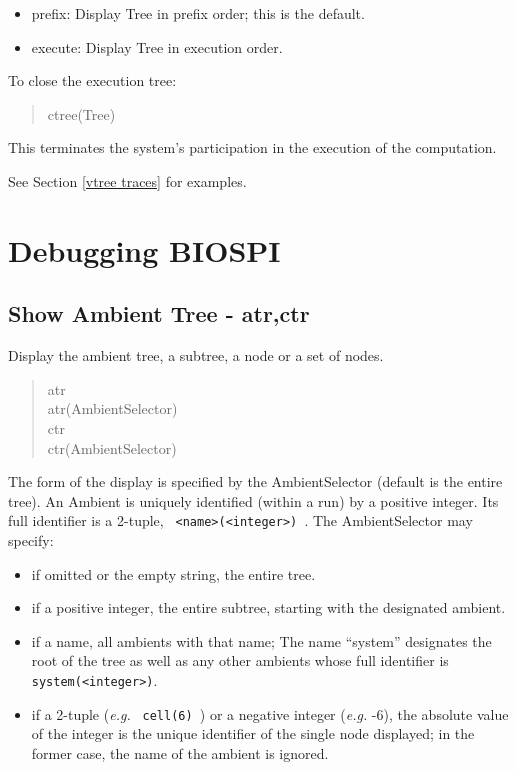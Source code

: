 \begin{itemize}
\item prefix:   Display Tree in prefix order; this is the default.
\item execute:  Display Tree in execution order.
\end{itemize}

\noindent
To close the execution tree:

\begin{verse}
    ctree(Tree)
\end{verse}

\noindent
This terminates the system's
participation in the execution of the computation.

\noindent
See Section \ref{vtree traces} for examples.

\section{Debugging BIOSPI}

\subsection{Show Ambient Tree - atr,ctr}
\label{xtr}

Display the ambient tree, a subtree, a node or a set of nodes.

\begin{verse}
   atr \\
   atr(AmbientSelector) \\
   ctr \\
   ctr(AmbientSelector)
\end{verse}

\noindent
The form of the display is specified
by the AmbientSelector (default is the entire tree).  An Ambient is
uniquely identified (within a run) by a positive integer.  Its
full identifier is a 2-tuple, \verb+ <name>(<integer>) +.  The
AmbientSelector may specify:

\begin{itemize}
\item if omitted or the empty string, the entire tree.
\item if a positive integer, the entire subtree, starting with the
  designated ambient.
\item if a name, all ambients with that name;
  The name ``system'' designates the root of the tree as well as
  any other ambients whose full identifier is \verb+ system(<integer>)+.
\item if a 2-tuple ({\em e.g.} \verb+ cell(6) +) or a negative integer 
  ({\em e.g.} -6), the absolute value of the integer is the unique
  identifier of the single node displayed; in the former case,
  the name of the ambient is ignored.
\end{itemize}

